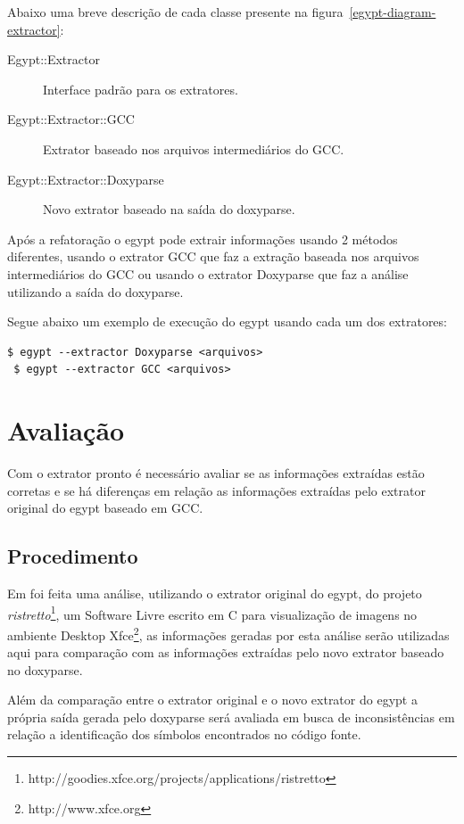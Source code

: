 Abaixo uma breve descrição de cada classe presente na
figura~\ref{egypt-diagram-extractor}:

\begin{description}
\item[Egypt::Extractor] Interface padrão para os extratores.
\item[Egypt::Extractor::GCC] Extrator baseado nos arquivos intermediários do GCC.
\item[Egypt::Extractor::Doxyparse] Novo extrator baseado na saída do doxyparse.
\end{description}

Após a refatoração o egypt pode extrair informações usando 2 métodos
diferentes, usando o extrator GCC que faz a extração baseada nos arquivos
intermediários do GCC ou usando o extrator Doxyparse que faz a análise
utilizando a saída do doxyparse.

Segue abaixo um exemplo de execução do egypt usando cada um dos extratores:

\begin{Verbatim}[frame=single,fontsize=\relsize{-2},fontfamily=courier]
 $ egypt --extractor Doxyparse <arquivos>
 $ egypt --extractor GCC <arquivos>
\end{Verbatim}

\chapter{Avaliação} \label{ch:avaliacao}

Com o extrator pronto é necessário avaliar se as informações extraídas estão
corretas e se há diferenças em relação as informações extraídas pelo extrator
original do egypt baseado em GCC.

\section{Procedimento}

Em \cite{structuralComplexityEvolution} foi feita uma análise, utilizando o
extrator original do egypt, do projeto {\it
ristretto}\footnote{http://goodies.xfce.org/projects/applications/ristretto},
um Software Livre escrito em C para visualização de imagens no ambiente Desktop
Xfce\footnote{http://www.xfce.org}, as informações geradas por esta análise
serão utilizadas aqui para comparação com as informações extraídas pelo novo
extrator baseado no doxyparse.

Além da comparação entre o extrator original e o novo extrator do egypt a
própria saída gerada pelo doxyparse será avaliada em busca de inconsistências
em relação a identificação dos símbolos encontrados no código fonte.

